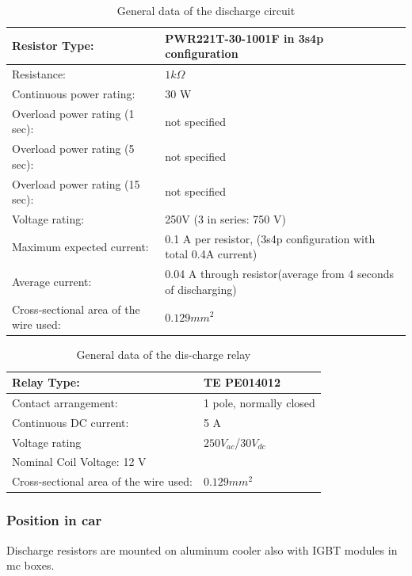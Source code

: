 \begin{table}[H]
	\centering
	\caption{General data of the discharge circuit}
	\begin{tabularx}{\textwidth}{|X|X|}
		\hline
		Resistor Type: & PWR221T-30-1001F in 3s4p configuration \\[\TableSize]
		\hline
		Resistance: & $1 k\Omega$ \\[\TableSize]
		\hline
		Continuous power rating: & 30 W \\[\TableSize]
		\hline
		Overload power rating (1 sec): & not specified \\[\TableSize]
		\hline
		Overload power rating (5 sec): & not specified \\[\TableSize]
		\hline
		Overload power rating (15 sec): & not specified \\[\TableSize]
		\hline
		Voltage rating: & 250V (3 in series: 750 V) \\[\TableSize]
		\hline
		Maximum expected current: & 0.1 A per resistor, (3s4p configuration with total 0.4A current) \\[\TableSize]
		\hline
		Average current: & 0.04 A through resistor(average from 4 seconds of discharging) \\[\TableSize]
		\hline
		Cross-sectional area of the wire used: & $0.129 mm^2$ \\[\TableSize]
		\hline
	\end{tabularx}%
	\label{tab:dischrage-circ}%
\end{table}%

\begin{table}[H]
	\centering
	\caption{General data of the dis-charge relay}
	\begin{tabularx}{\textwidth}{|X|X|}
		\hline
		Relay Type: & TE PE014012 \\[\TableSize]
		\hline
		Contact arrangement: & 1 pole, normally closed  \\[\TableSize]
		\hline
		Continuous DC current: & 5 A \\[\TableSize]
		\hline
		Voltage rating  & $250 V_{ac}$/$30 V_{dc}$ \footnotemark \\[\TableSize]
		\hline
		Nominal Coil Voltage: 12 V & \\[\TableSize]
		\hline
		Cross-sectional area of the wire used: & $0.129 mm^2$ \\[\TableSize]
		\hline
	\end{tabularx}%
	\label{tab:discharge-relay}%
\end{table}%




\subsubsection{Position in car}

Discharge resistors are mounted on aluminum cooler also with IGBT modules in \gls{mc} boxes.